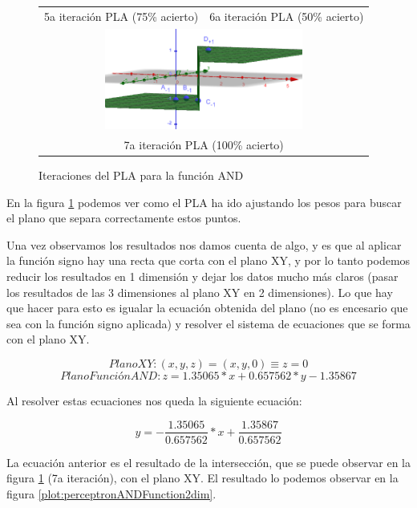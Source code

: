 \begin{figure}[h]
\begin{tabular}{cc}
    5a iteración PLA (75\% acierto) & 6a iteración PLA (50\% acierto) \\[6pt]
    \multicolumn{2}{c}{\includegraphics[width=65mm]{Figures/PerceptronPLA7thiteration}}\\
    \multicolumn{2}{c}{7a iteración PLA (100\% acierto)}
    \end{tabular}
\caption{Iteraciones del PLA para la función AND}
\label{fig:andFunctionPLAIterations}
\end{figure}

\newpage

En la figura \ref{fig:andFunctionPLAIterations} podemos ver como el PLA ha ido ajustando los pesos para buscar el plano que separa correctamente estos puntos.

Una vez observamos los resultados nos damos cuenta de algo, y es que al aplicar la función signo hay una recta que corta con el plano XY, y por lo tanto podemos reducir los resultados en 1 dimensión y dejar los datos mucho más claros (pasar los resultados de las 3 dimensiones al plano XY en 2 dimensiones). Lo que hay que hacer para esto es igualar la ecuación obtenida del plano (no es encesario que sea con la función signo aplicada) y resolver el sistema de ecuaciones que se forma con el plano XY.

\[PlanoXY: (x,y,z)=(x,y,0)\equiv z=0\]
\[PlanoFunciónAND:z=1.35065*x+0.657562*y-1.35867\]

Al resolver estas ecuaciones nos queda la siguiente ecuación:

\[y=-\dfrac{1.35065}{0.657562}*x+\dfrac{1.35867}{0.657562}\]

La ecuación anterior es el resultado de la intersección, que se puede observar en la figura \ref{fig:andFunctionPLAIterations} (7a iteración), con el plano XY. El resultado lo podemos observar en la figura \ref{plot:perceptronANDFunction2dim}.

